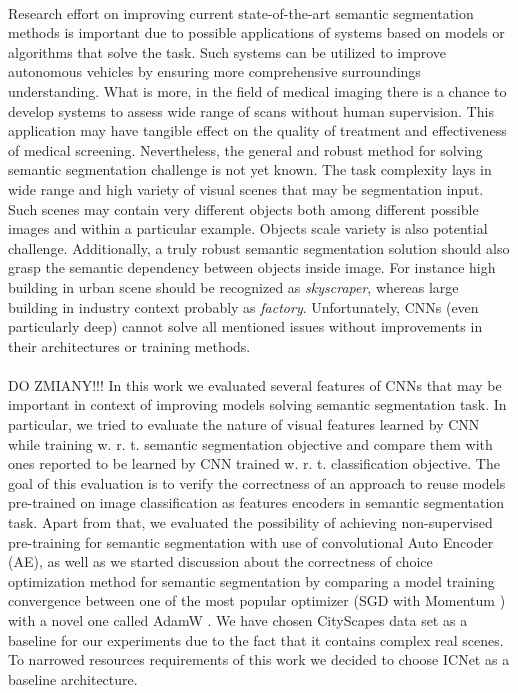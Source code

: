 \documentclass{article}
\begin{document}
\paragraph{}
Research effort on improving current state-of-the-art semantic segmentation methods is important due to possible applications of systems based on models or algorithms that solve the task. Such systems can be utilized to improve autonomous vehicles by ensuring more comprehensive surroundings understanding. What is more, in the field of medical imaging there is a chance to develop systems to assess wide range of scans without human supervision. This application may have tangible effect on the quality of treatment and effectiveness of medical screening. Nevertheless, the general and robust method for solving semantic segmentation challenge is not yet known. The task complexity lays in wide range and high variety of visual scenes that may be segmentation input. Such scenes may contain very different objects both among different possible images and within a particular example. Objects scale variety is also potential challenge. Additionally, a truly robust semantic segmentation solution should also grasp the semantic dependency between objects inside image. For instance high building in urban scene should be recognized as \textit{skyscraper}, whereas large building in industry context probably as \textit{factory}. Unfortunately, CNNs (even particularly deep) cannot solve all mentioned issues without improvements in their architectures or training methods. 

\paragraph{}
DO ZMIANY!!!\newline
In this work we evaluated several features of CNNs that may be important in context of improving models solving semantic segmentation task. In particular, we tried to evaluate the nature of visual features learned by CNN while training w. r. t. semantic segmentation objective and compare them with ones reported to be learned by CNN trained w. r. t. classification objective. The goal of this evaluation is to verify the correctness of an approach to reuse models pre-trained on image classification as features encoders in semantic segmentation task. Apart from that, we evaluated the possibility of achieving non-supervised pre-training for semantic segmentation with use of convolutional Auto Encoder (AE), as well as we started discussion about the correctness of choice optimization method for semantic segmentation by comparing a model training convergence between one of the most popular optimizer (SGD with Momentum \cite{sgd_mom}) with a novel one called AdamW \cite{adamw}. We have chosen CityScapes \cite{cityscapes} data set as a baseline for our experiments due to the fact that it contains complex real scenes. To narrowed resources requirements of this work we decided to choose ICNet \cite{icnet} as a baseline architecture.
\end{document}
